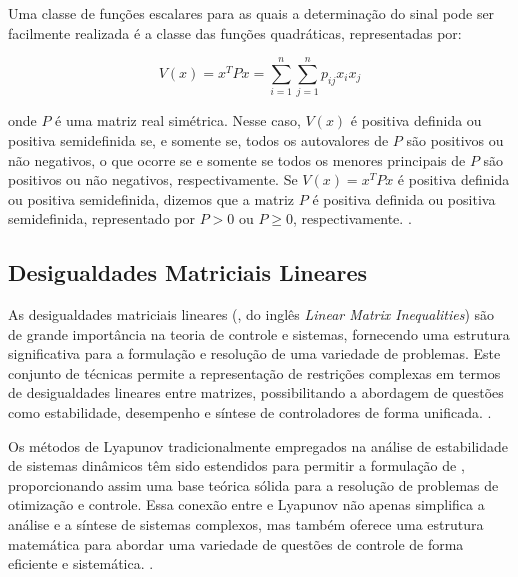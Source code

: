 Uma classe de funções escalares para as quais a determinação do sinal pode ser facilmente realizada é a classe das funções quadráticas, representadas por:

$$ V(x) = x^T P x = \sum_{i=1}^n \sum_{j=1}^n p_{ij} x_i x_j $$

\noindent onde $P$ é uma matriz real simétrica. Nesse caso, $V(x)$ é positiva definida ou positiva semidefinida se, e somente se, todos os autovalores de $P$ são positivos ou não negativos, o que ocorre se e somente se todos os menores principais de $P$ são positivos ou não negativos, respectivamente. Se $V(x) = x^T P x$ é positiva definida ou positiva semidefinida, dizemos que a matriz $P$ é positiva definida ou positiva semidefinida, representado por $P > 0$ ou $P \geq 0$, respectivamente. \cite{khalil2002}.

\subsection{Desigualdades Matriciais Lineares}

As desigualdades matriciais lineares (, do inglês \textit{Linear Matrix Inequalities}) são de grande importância na teoria de controle e sistemas, fornecendo uma estrutura significativa para a formulação e resolução de uma variedade de problemas. Este conjunto de técnicas permite a representação de restrições complexas em termos de desigualdades lineares entre matrizes, possibilitando a abordagem de questões como estabilidade, desempenho e síntese de controladores de forma unificada. \cite{boyd1994}.

Os métodos de Lyapunov tradicionalmente empregados na análise de estabilidade de sistemas dinâmicos têm sido estendidos para permitir a formulação de , proporcionando assim uma base teórica sólida para a resolução de problemas de otimização e controle. Essa conexão entre  e Lyapunov não apenas simplifica a análise e a síntese de sistemas complexos, mas também oferece uma estrutura matemática para abordar uma variedade de questões de controle de forma eficiente e sistemática. \cite{boyd1994}.


